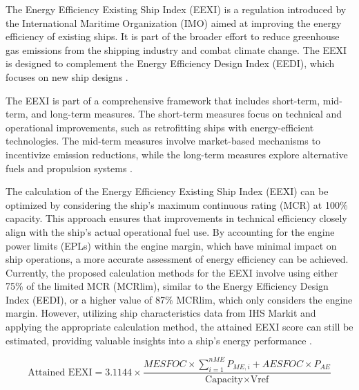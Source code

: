 The Energy Efficiency Existing Ship Index (EEXI) is a regulation introduced by the International Maritime Organization (IMO) aimed at improving the energy efficiency of existing ships.
It is part of the broader effort to reduce greenhouse gas emissions from the shipping industry and combat climate change.
The EEXI is designed to complement the Energy Efficiency Design Index (EEDI), which focuses on new ship designs \autocite{czermanski2022implementation}.

The EEXI is part of a comprehensive framework that includes short-term, mid-term, and long-term measures.
The short-term measures focus on technical and operational improvements, such as retrofitting ships with energy-efficient technologies.
The mid-term measures involve market-based mechanisms to incentivize emission reductions, while the long-term measures explore alternative fuels and propulsion systems \autocite{CHUAH2023115348}.

The calculation of the Energy Efficiency Existing Ship Index (EEXI) can be optimized by considering the ship's maximum continuous rating (MCR) at 100\% capacity.
This approach ensures that improvements in technical efficiency closely align with the ship's actual operational fuel use.
By accounting for the engine power limits (EPLs) within the engine margin, which have minimal impact on ship operations, a more accurate assessment of energy efficiency can be achieved.
Currently, the proposed calculation methods for the EEXI involve using either 75\% of the limited MCR (MCRlim), similar to the Energy Efficiency Design Index (EEDI), or a higher value of 87\% MCRlim, which only considers the engine margin.
However, utilizing ship characteristics data from IHS Markit and applying the appropriate calculation method, the attained EEXI score can still be estimated, providing valuable insights into a ship's energy performance \autocite{rutherford2020potential}.

\begin{equation}
    \text{Attained EEXI} = 3.1144 \times \frac{MESFOC \times \sum_{i=1}^{nME} P_{ME,i} + AESFOC \times P_{AE}}{\text{Capacity} \times \text{Vref}}
    \label{eq:attained_eexi}
\end{equation}

